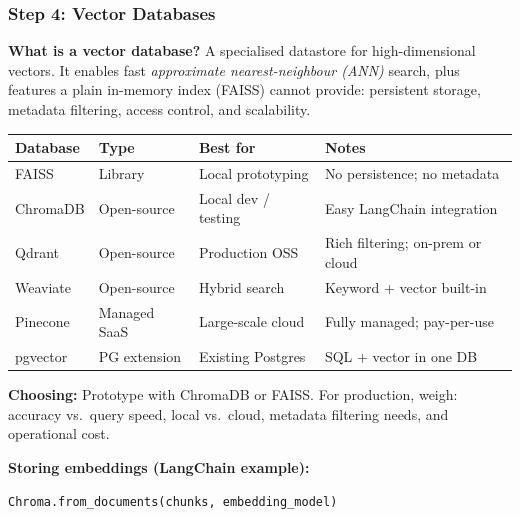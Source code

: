 \begin{frame}[fragile]\frametitle{Step 4: Vector Databases}

\textbf{What is a vector database?}
A specialised datastore for high-dimensional vectors. It enables fast \textit{approximate nearest-neighbour (ANN)} search, plus features a plain in-memory index (FAISS) cannot provide: persistent storage, metadata filtering, access control, and scalability.

\vspace{0.3em}
\begin{center}
\small
\begin{tabular}{|p{1.5cm}|p{1.5cm}|p{1.5cm}|p{2.5cm}|}
\hline
\textbf{Database} & \textbf{Type} & \textbf{Best for} & \textbf{Notes} \\
\hline
FAISS      & Library        & Local prototyping    & No persistence; no metadata \\
ChromaDB   & Open-source    & Local dev / testing  & Easy LangChain integration \\
Qdrant     & Open-source    & Production OSS       & Rich filtering; on-prem or cloud \\
Weaviate   & Open-source    & Hybrid search        & Keyword + vector built-in \\
Pinecone   & Managed SaaS   & Large-scale cloud    & Fully managed; pay-per-use \\
pgvector   & PG extension   & Existing Postgres    & SQL + vector in one DB \\
\hline
\end{tabular}
\end{center}

\vspace{0.3em}
\textbf{Choosing:} Prototype with ChromaDB or FAISS. For production, weigh: accuracy vs.\ query speed, local vs.\ cloud, metadata filtering needs, and operational cost.

\textbf{Storing embeddings (LangChain example):}
\begin{center}
\texttt{Chroma.from\_documents(chunks, embedding\_model)}
\end{center}

\end{frame}



